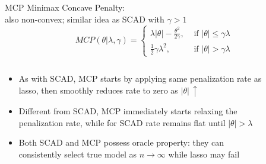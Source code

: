 \documentclass[11pt,compress,t,notes=noshow, xcolor=table]{beamer}
\begin{document}
\begin{vbframe}{MCP }
Minimax Concave Penalty:\\
also non-convex; similar idea as SCAD with $\gamma>1$
$$
MCP(\theta | \lambda, \gamma)= \begin{cases}\lambda|\theta|-\frac{\theta^2}{2 \gamma}, & \text { if }|\theta| \leq \gamma \lambda \\ \frac{1}{2} \gamma \lambda^2, & \text { if }|\theta|>\gamma \lambda\end{cases}
$$

\begin{columns}

\begin{column}{0.4\textwidth}

{\scriptsize
\begin{itemize}\setlength{\itemsep}{1.0em}
    \item As with SCAD, MCP starts by applying same penalization rate as lasso, then smoothly reduces rate to zero as $|\theta|\,\uparrow$
    \item Different from SCAD, MCP immediately starts relaxing the penalization rate, while for SCAD rate remains flat until $|\theta|>\lambda$
    \item Both SCAD and MCP possess oracle property: they can consistently select true model as $n \to \infty$ while lasso may fail
\end{itemize}
}
\end{column}

\begin{column}{0.6\textwidth}

\begin{figure}
      \centering
    \end{figure}

\end{column}

\end{columns}


\end{vbframe}
\end{document}
